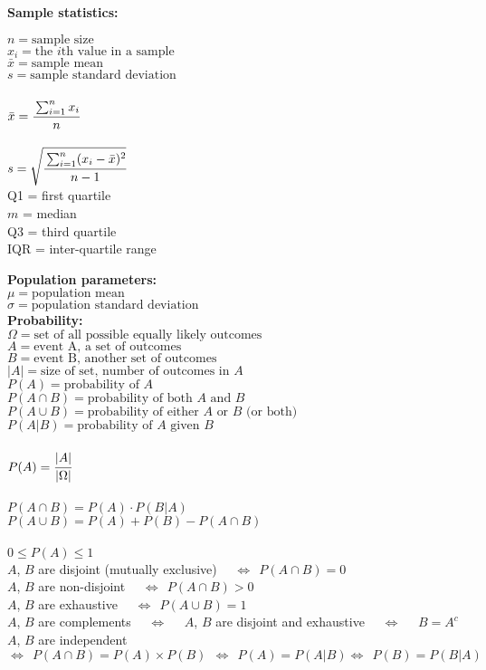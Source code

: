 \documentclass[12pt,letterpaper]{article}
\begin{document}
\Large
{}
{\bf Sample statistics:}\vspace{-10pt}
\begin{multicols}{2}\noindent 
$n=\text{sample size} $\\
$x_i=\text{the $i$th value in a sample} $\\
$\bar x = \text{sample mean}$\\
$s = \text{sample standard deviation}$\\\\
$\bar x = \cfrac{\sum_{i=1}^n x_i}{n}$\\\\
$s = \sqrt{\cfrac{\sum_{i=1}^n (x_i-\bar x)^2}{n-1}}$ \\

\columnbreak \noindent
Q1 = first quartile\\
$m$ = median\\
Q3 = third quartile\\
IQR = inter-quartile range\\
\end{multicols}

{\bf Population parameters:}\\
$\mu = \text{population mean}$\\
$\sigma = \text{population standard deviation}$\\

{\bf Probability:}\\
$\Omega = \text{set of all possible equally likely outcomes}$\\
$A = \text{event A, a set of outcomes}$\\
$B = \text{event B, another set of outcomes}$\\
$|A| = \text{size of set, number of outcomes in } A$\\
$P(A) = \text{probability of }A$\\
$P(A \cap B) = \text{probability of both $A$ and $B$}$\\
$P(A \cup B) = \text{probability of either $A$ or $B$ (or both)}$\\
$P(A | B) = \text{probability of $A$ given $B$}$\\\\
$P(A) = \cfrac{|A|}{|\Omega|}$\\\\
$P(A \cap B) = P(A) \cdot P(B|A)$\\
$P(A \cup B) = P(A) + P(B) - P(A\cap B)$\\
\\
$0 \le P(A) \le 1$\\
$A$, $B$ are disjoint (mutually exclusive) ~~$\iff~~P(A\cap B) = 0$\\
$A$, $B$ are non-disjoint ~~$\iff~~P(A\cap B) > 0$\\
$A$, $B$ are exhaustive ~~$\iff~~P(A\cup B) = 1$\\
$A$, $B$ are complements ~~$\iff$~~ $A$, $B$ are disjoint and exhaustive ~~$\iff$~~ $B=A^c$\\
$A$, $B$ are independent ~~$\iff~~P(A\cap B) = P(A)\times P(B) ~~\iff~~ P(A)=P(A|B) \iff~~ P(B)=P(B|A) $\\
\end{document}
